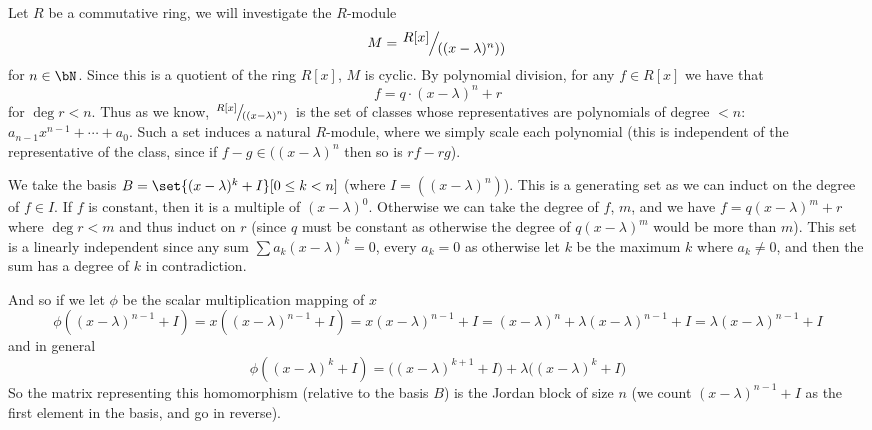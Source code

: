 \documentclass[10pt]{article}
\begin{document}
\begin{exam*}

    Let $R$ be a commutative ring, we will investigate the $R$-module 
    \[ M = \slfrac{R[x]}{((x-\lambda)^n))} \]
    for $n\in\bN$.
    Since this is a quotient of the ring $R[x]$, $M$ is cyclic.
    By polynomial division, for any $f\in R[x]$ we have that
    \[ f = q\cdot(x-\lambda)^n+r \]
    for $\deg r<n$.
    Thus as we know, $\slfrac{R[x]}{((x-\lambda)^n)}$ is the set of classes whose representatives are polynomials of degree $<n$: $a_{n-1}x^{n-1}+\cdots+a_0$.
    Such a set induces a natural $R$-module, where we simply scale each polynomial (this is independent of the representative of the class, since if $f-g\in((x-\lambda)^n$ then so is $rf-rg$).

    We take the basis $B=\set{(x-\lambda)^k + I}[0\leq k<n]$ (where $I=((x-\lambda)^n)$).
    This is a generating set as we can induct on the degree of $f\in I$.
    If $f$ is constant, then it is a multiple of $(x-\lambda)^0$.
    Otherwise we can take the degree of $f$, $m$, and we have $f=q(x-\lambda)^m+r$ where $\deg r<m$ and thus induct on $r$ (since $q$ must be constant as otherwise the degree of $q(x-\lambda)^m$ would be
    more than $m$).
    This set is a linearly independent since any sum $\sum a_k(x-\lambda)^k=0$, every $a_k=0$ as otherwise let $k$ be the maximum $k$ where $a_k\neq0$, and then the sum has a degree of $k$ in contradiction.

    And so if we let $\phi$ be the scalar multiplication mapping of $x$
    \[ \phi((x-\lambda)^{n-1} + I) = x((x-\lambda)^{n-1} + I) = x(x-\lambda)^{n-1} + I = (x-\lambda)^n + \lambda(x-\lambda)^{n-1} + I = \lambda(x-\lambda)^{n-1} + I \]
    and in general
    \[ \phi((x-\lambda)^k + I) = \bigl((x-\lambda)^{k+1} + I\bigr) + \lambda\bigl((x-\lambda)^k + I\bigr) \]
    So the matrix representing this homomorphism (relative to the basis $B$) is the Jordan block of size $n$ (we count $(x-\lambda)^{n-1}+I$ as the first element in the basis, and go in reverse).

\end{exam*}
\end{document}
